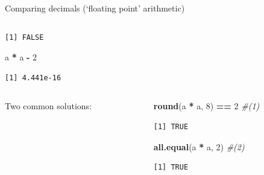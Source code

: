 \documentclass[
  11pt,
  ignorenonframetext,
]{beamer}
\newcommand{\VERB}{\Verb[commandchars=\\\{\}]}
\newenvironment{Shaded}{\begin{snugshade}}{\end{snugshade}}
\newcommand{\CommentTok}[1]{\textcolor[rgb]{0.56,0.35,0.01}{\textit{#1}}}
\newcommand{\DecValTok}[1]{\textcolor[rgb]{0.00,0.00,0.81}{#1}}
\newcommand{\FunctionTok}[1]{\textcolor[rgb]{0.13,0.29,0.53}{\textbf{#1}}}
\newcommand{\NormalTok}[1]{#1}
\newcommand{\SpecialCharTok}[1]{\textcolor[rgb]{0.81,0.36,0.00}{\textbf{#1}}}
\providecommand{\tightlist}{%
  \setlength{\itemsep}{0pt}\setlength{\parskip}{0pt}}
\begin{document}
\begin{frame}[fragile]{Comparing decimals (`floating point' arithmetic)}
\begin{columns}[T,onlytextwidth]
\begin{column}{0.48\textwidth}
\begin{verbatim}
[1] FALSE
\end{verbatim}

\begin{Shaded}
\begin{Highlighting}[]
\NormalTok{a }\SpecialCharTok{*}\NormalTok{ a }\SpecialCharTok{{-}} \DecValTok{2}
\end{Highlighting}
\end{Shaded}

\begin{verbatim}
[1] 4.441e-16
\end{verbatim}
\end{column}
\end{columns}

\begin{columns}[T,onlytextwidth]
\begin{column}{0.48\textwidth}
Two common solutions:

\end{column}

\begin{column}{0.48\textwidth}
\begin{Shaded}
\begin{Highlighting}[]
\FunctionTok{round}\NormalTok{(a }\SpecialCharTok{*}\NormalTok{ a, }\DecValTok{8}\NormalTok{) }\SpecialCharTok{==} \DecValTok{2}  \CommentTok{\#(1)}
\end{Highlighting}
\end{Shaded}

\begin{verbatim}
[1] TRUE
\end{verbatim}

\begin{Shaded}
\begin{Highlighting}[]
\FunctionTok{all.equal}\NormalTok{(a }\SpecialCharTok{*}\NormalTok{ a, }\DecValTok{2}\NormalTok{)   }\CommentTok{\#(2)}
\end{Highlighting}
\end{Shaded}

\begin{verbatim}
[1] TRUE
\end{verbatim}
\end{column}
\end{columns}
\end{frame}
\end{document}
